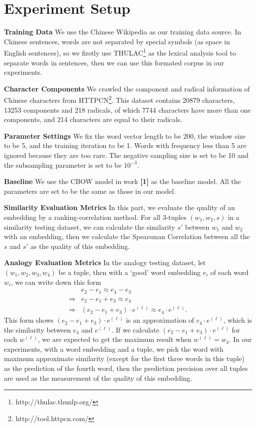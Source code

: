 
\section{Experiment Setup}

\textbf{Training Data} We use the Chinese Wikipedia as our training data source. In Chinese sentences, words are not separated by special symbols (as space in English sentences), so we firstly use THULAC\footnote{http://thulac.thunlp.org/} as the lexical analysis tool to separate words in sentences, then we can use this formated corpus in our experiments.

\textbf{Character Components} We crawled the component and radical information of Chinese characters from HTTPCN\footnote{http://tool.httpcn.com/}. This dataset contains 20879 characters, 13253 components and 218 radicals, of which 7744 characters have more than one components, and 214 characters are equal to their radicals.

\textbf{Parameter Settings} We fix the word vector length to be 200, the window size to be 5, and the training iteration to be 1. Words with frequency less than 5 are ignored because they are too rare. The negative sampling size is set to be 10 and the subsampling parameter is set to be $10^{-3}$.

\textbf{Baseline} We use the CBOW model in work \textbf{[1]} as the baseline model. All the parameters are set to be the same as those in our model.

\textbf{Similarity Evaluation Metrics} In this part, we evaluate the quality of an embedding by a ranking-correlation method. For all 3-tuples $(w_1, w_2, s)$ in a similarity testing dataset, we can calculate the similarity $s'$ between $w_1$ and $w_2$ with an embedding, then we calculate the Spearsman Correlation between all the $s$ and $s'$ as the quality of this embedding.

\textbf{Analogy Evaluation Metrics} In the analogy testing dataset, let $(w_1, w_2, w_3, w_4)$ be a tuple, then with a `good' word embedding $e_i$ of each word $w_i$, we can write down this form
\begin{align*}
	& e_2 - e_1 \approx e_4 - e_3 \\
	\Rightarrow & e_2 - e_1 + e_3 \approx e_4 \\
	\Rightarrow & (e_2 - e_1 + e_3)\cdot e^{(\ell)} \approx e_4\cdot e^{(\ell)}.
\end{align*}
This form shows $(e_2 - e_1 + e_3)\cdot e^{(\ell)}$ is an approximation of $e_4\cdot e^{(\ell)}$, which is the similarity between $e_4$ and $e^{(\ell)}$. If we calculate $(e_2 - e_1 + e_3)\cdot e^{(\ell)}$ for each $w^{(\ell)}$, we are expected to get the maximum result when $w^{(\ell)}=w_4$. In our experiments, with a word embedding and a tuple, we pick the word with maximum approximate similarity (except for the first three words in this tuple) as the prediction of the fourth word, then the prediction precision over all tuples are used as the measurement of the quality of this embedding.
